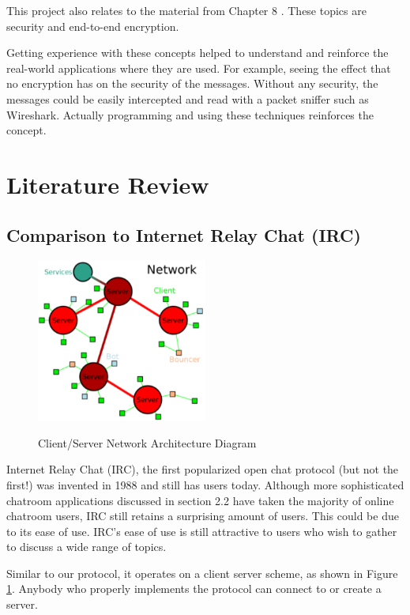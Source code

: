 \documentclass{article}
\begin{document}
This project also relates to the material from Chapter 8 \cite{kurose}. These topics are security and end-to-end encryption. 

Getting experience with these concepts helped to understand and reinforce the real-world applications where they are used. For example, seeing the effect that no encryption has on the security of the messages. Without any security, the messages could be easily intercepted and read with a packet sniffer such as Wireshark. Actually programming and using these techniques reinforces the concept.

\section{Literature Review}

\subsection{Comparison to Internet Relay Chat (IRC)}

\begin{figure}[h]
\caption{Client/Server Network Architecture Diagram}
\centering
\includegraphics[width=0.5\textwidth]{media/Network.PNG}
\label{Network Architecture}
\end{figure}

Internet Relay Chat (IRC), the first popularized open chat protocol (but not the first!) was invented in 1988 and still has users today. Although more sophisticated chatroom applications discussed in section 2.2 have taken the majority of online chatroom users, IRC still retains a surprising amount of users. This could be due to its ease of use. IRC's ease of use is still attractive to users who wish to gather to discuss a wide range of topics. 

Similar to our protocol, it operates on a client server scheme, as shown in Figure \ref{Network Architecture}. Anybody who properly implements the protocol can connect to or create a server. 
\end{document}
